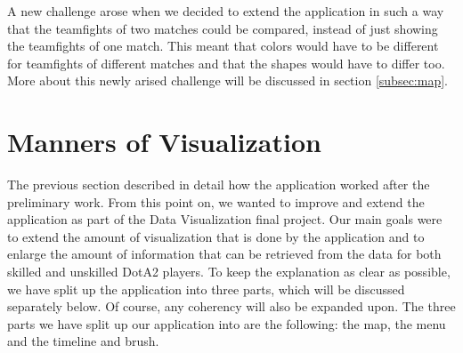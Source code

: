 \documentclass[11pt,twoside,a4paper]{article}
\begin{document}
A new challenge arose when we decided to extend the application in such a way that the teamfights of two matches could be compared, instead of just showing the teamfights of one match. This meant that colors would have to be different for teamfights of different matches and that the shapes would have to differ too. More about this newly arised challenge will be discussed in section \ref{subsec:map}.

\section{Manners of Visualization}
\label{sec:mov}
The previous section described in detail how the application worked after the preliminary work. From this point on, we wanted to improve and extend the application as part of the Data Visualization final project. Our main goals were to extend the amount of visualization that is done by the application and to enlarge the amount of information that can be retrieved from the data for both skilled and unskilled DotA2 players. 
\newline
To keep the explanation as clear as possible, we have split up the application into three parts, which will be discussed separately below. Of course, any coherency will also be expanded upon. The three parts we have split up our application into are the following: the map, the menu and the timeline and brush.
\end{document}

